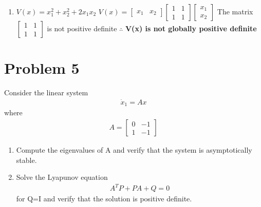 \documentclass{article}
\begin{document}
\begin{enumerate}[label=(\roman*)]
   \item $V(x) = x_1^2 + x_2^2 + 2x_1x_2$ \newline \newline
       $V(x) = \begin{bmatrix}
                x_1 & x_2
              \end{bmatrix}
              \begin{bmatrix}
                1 & 1 \\
                1 & 1 
              \end{bmatrix}
              \begin{bmatrix}
                x_1 \\
                x_2
              \end{bmatrix}$
      The matrix $\begin{bmatrix}
                1 & 1 \\
                1 & 1
              \end{bmatrix}$ is not positive definite \newline \newline
      $\therefore$ \textbf{V(x) is not globally positive definite} \newline
 
  \end{enumerate}

  \newpage

  \section{Problem 5}

  Consider the linear system
  \begin{align*}
    \dot{x}_1 = Ax
  \end{align*}
  where
  \begin{align*}
    A =
    \begin{bmatrix}
      0 & -1 \\
      1 & -1
    \end{bmatrix}
  \end{align*}
  
  \begin{enumerate}[label=(\alph*)]
    \item Compute the eigenvalues of A and verify that the system is
      asymptotically stable.
    \item Solve the Lyapunov equation
      \begin{align*}
        A^TP + PA + Q = 0
      \end{align*}
      for Q=I and verify that the solution is positive definite.
  \end{enumerate}
\end{document}
